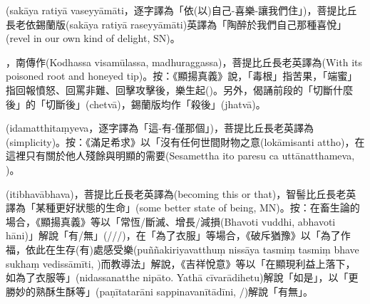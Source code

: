 \startitemgroup[noteitems]
\item{}(sakāya ratiyā vaseyyāmāti，逐字譯為「依(以)自己-喜樂-讓我們住」)，菩提比丘長老依錫蘭版(sakāya ratiyā raseyyāmāti)英譯為「陶醉於我們自己那種喜悅」(revel in our own kind of delight, SN)。
\stopitemgroup

\startitemgroup[noteitems]
\item{}，南傳作(Kodhassa visamūlassa, madhuraggassa)，菩提比丘長老英譯為(With its poisoned root and honeyed tip)。按：《顯揚真義》說，「毒根」指苦果，「端蜜」指回報憤怒、回罵非難、回擊攻擊後，樂生起()。另外，偈誦前段的「切斷什麼後」的「切斷後」(chetvā)，錫蘭版均作「殺後」(jhatvā)。
\stopitemgroup

\startitemgroup[noteitems]
\item{}(idamatthitaṃyeva，逐字譯為「這-有-僅那個」)，菩提比丘長老英譯為(simplicity)。按：《滿足希求》以「沒有任何世間財物之意(lokāmisanti attho)，在這裡只有關於他人殘餘與明顯的需要(Sesamettha ito paresu ca uttānatthameva, )。
\stopitemgroup

\startitemgroup[noteitems]
\item{}(itibhavābhava)，菩提比丘長老英譯為(becoming this or that)，智髻比丘長老英譯為「某種更好狀態的生命」(some better state of being, MN)。按：在畜生論的場合，《顯揚真義》等以「常恆/斷滅、增長/減損(Bhavoti vuddhi, abhavoti hāni)」解說「有/無」(///)，在「為了衣服」等場合，《破斥猶豫》以「為了作福，依此在生存(有)處感受樂(puññakiriyavatthuṃ nissāya tasmiṃ tasmiṃ bhave sukhaṃ vedissāmīti, )而教導法」解說，《吉祥悅意》等以「在顯現利益上落下，如為了衣服等」(nidassanatthe nipāto. Yathā cīvarādihetu)解說「如是」，以「更勝妙的熟酥生酥等」(paṇītatarāni sappinavanītādīni, /)解說「有無」。
\stopitemgroup

